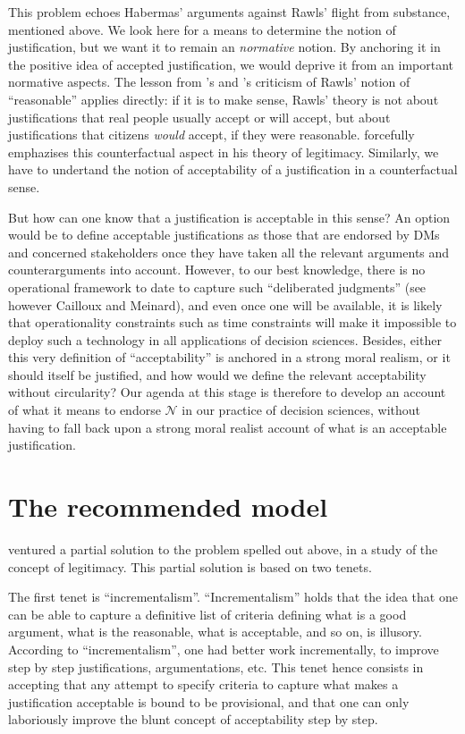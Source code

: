 \documentclass[preprint, french, english, 11pt, authoryear]{elsarticle}%
\newcommand{\adv}{\mathscr{N}}
\begin{document}
This problem echoes Habermas' arguments against Rawls' flight from substance, mentioned above. We look here for a means to determine the notion of justification, but we want it to remain an \emph{normative} notion. By anchoring it in the positive idea of accepted justification, we would deprive it from an important normative aspects. The lesson from \cite{habermas_reconciliation_1995}'s and \cite{estlund_democratic_2009}'s criticism of Rawls' notion of ``reasonable'' applies directly: if it is to make sense, Rawls' theory is not about justifications that real people usually accept or will accept, but about justifications that citizens \emph{would} accept, if they were reasonable. \cite{habermas_faktizitat_1992} forcefully emphazises this counterfactual aspect in his theory of legitimacy. Similarly, we have to undertand the notion of acceptability of a justification in a counterfactual sense. 

But how can one know that a justification is acceptable in this sense? An option would be to define acceptable justifications as those that are endorsed by \acp{DM} and concerned stakeholders once they have taken all the relevant arguments and counterarguments into account. However, to our best knowledge, there is no operational framework to date to capture such ``deliberated judgments'' (see however Cailloux and Meinard), and even once one will be available, it is likely that operationality constraints such as time constraints will make it impossible to deploy such a technology in all applications of decision sciences. Besides, either this very definition of ``acceptability'' is anchored in a strong moral realism, or it should itself be justified, and how would we define the relevant acceptability without circularity? Our agenda at this stage is therefore to develop an account of what it means to endorse $\adv$ in our practice of decision sciences, without having to fall back upon a strong moral realist account of what is an acceptable justification.

\section{The recommended model}
\cite{meinard_what_2017} ventured a partial solution to the problem spelled out above, in a study of the concept of legitimacy. This partial solution is based on two tenets.

The first tenet is ``incrementalism''. ``Incrementalism'' holds that the idea that one can be able to capture a definitive list of criteria defining what is a good argument, what is the reasonable, what is acceptable, and so on, is illusory. According to ``incrementalism'', one had better work incrementally, to improve step by step justifications, argumentations, etc. This tenet hence consists in accepting that any attempt to specify criteria to capture what makes a justification acceptable is bound to be provisional, and that one can only laboriously improve the blunt concept of acceptability step by step.
\end{document}

